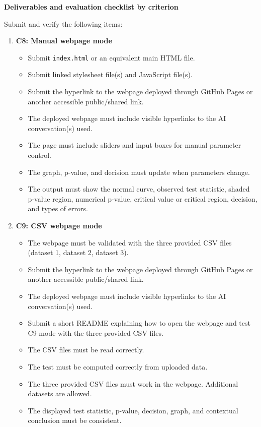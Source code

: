 \documentclass[12pt]{article}
\newcommand{\SubsectionBox}[1]{%
	\noindent\colorbox{gray!30}{%
		\parbox{\linewidth}{\textbf{#1}}%
	}\par\vspace{0.35cm}%
}
\begin{document}
	\SubsectionBox{Deliverables and evaluation checklist by criterion}
	Submit and verify the following items:
	\begin{enumerate}
		\item \textbf{C8: Manual webpage mode}
		\begin{itemize}
			\item Submit \texttt{index.html} or an equivalent main HTML file.
			\item Submit linked stylesheet file(s) and JavaScript file(s).
			\item Submit the hyperlink to the webpage deployed through GitHub Pages or another accessible public/shared link.
			\item The deployed webpage must include visible hyperlinks to the AI conversation(s) used.
			\item The page must include sliders and input boxes for manual parameter control.
			\item The graph, p-value, and decision must update when parameters change.
			\item The output must show the normal curve, observed test statistic, shaded p-value region, numerical p-value, critical value or critical region, decision, and types of errors.
		\end{itemize}
		
		\item \textbf{C9: CSV webpage mode}
		\begin{itemize}
			\item The webpage must be validated with the three provided CSV files (dataset 1, dataset 2, dataset 3).
			\item Submit the hyperlink to the webpage deployed through GitHub Pages or another accessible public/shared link.
			\item The deployed webpage must include visible hyperlinks to the AI conversation(s) used.
			\item Submit a short README explaining how to open the webpage and test C9 mode with the three provided CSV files.
			\item The CSV files must be read correctly.
			\item The test must be computed correctly from uploaded data.
			\item The three provided CSV files must work in the webpage. Additional datasets are allowed.
			\item The displayed test statistic, p-value, decision, graph, and contextual conclusion must be consistent.
		\end{itemize}
		

\end{enumerate}
\end{document}
